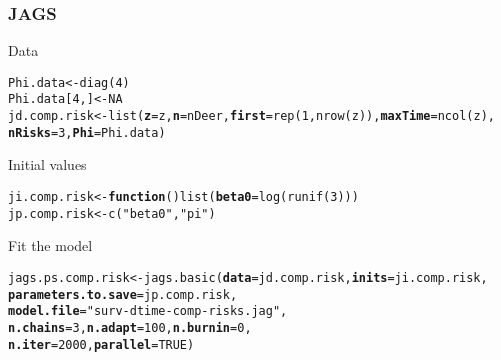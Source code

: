 \documentclass[color=usenames,dvipsnames]{beamer}\usepackage[]{graphicx}\usepackage[]{color}
\makeatletter
\newcommand{\hlnum}[1]{\textcolor[rgb]{0.69,0.494,0}{#1}}%
\newcommand{\hlstr}[1]{\textcolor[rgb]{0.749,0.012,0.012}{#1}}%
\newcommand{\hlstd}[1]{\textcolor[rgb]{0,0,0}{#1}}%
\newcommand{\hlkwa}[1]{\textcolor[rgb]{0,0,0}{\textbf{#1}}}%
\newcommand{\hlkwb}[1]{\textcolor[rgb]{0,0.341,0.682}{#1}}%
\newcommand{\hlkwc}[1]{\textcolor[rgb]{0,0,0}{\textbf{#1}}}%
\newcommand{\hlkwd}[1]{\textcolor[rgb]{0.004,0.004,0.506}{#1}}%
\newenvironment{kframe}{%
 \def\at@end@of@kframe{}%
 \ifinner\ifhmode%
  \def\at@end@of@kframe{\end{minipage}}%
  \begin{minipage}{\columnwidth}%
 \fi\fi%
 \def\FrameCommand##1{\hskip\@totalleftmargin \hskip-\fboxsep
 \colorbox{shadecolor}{##1}\hskip-\fboxsep
     \hskip-\linewidth \hskip-\@totalleftmargin \hskip\columnwidth}%
 \MakeFramed {\advance\hsize-\width
   \@totalleftmargin\z@ \linewidth\hsize
   \@setminipage}}%
 {\par\unskip\endMakeFramed%
 \at@end@of@kframe}
\newenvironment{knitrout}{}{} %
\makeatother
\begin{document}
\begin{frame}[fragile]
  \frametitle{JAGS}
  Data
\begin{knitrout}\scriptsize
{}\color{fgcolor}\begin{kframe}
\begin{alltt}
\hlstd{Phi.data} \hlkwb{<-} \hlkwd{diag}\hlstd{(}\hlnum{4}\hlstd{)}
\hlstd{Phi.data[}\hlnum{4}\hlstd{,]} \hlkwb{<-} \hlnum{NA}
\hlstd{jd.comp.risk} \hlkwb{<-} \hlkwd{list}\hlstd{(}\hlkwc{z}\hlstd{=z,} \hlkwc{n}\hlstd{=nDeer,} \hlkwc{first}\hlstd{=}\hlkwd{rep}\hlstd{(}\hlnum{1}\hlstd{,}\hlkwd{nrow}\hlstd{(z)),} \hlkwc{maxTime}\hlstd{=}\hlkwd{ncol}\hlstd{(z),}
                     \hlkwc{nRisks}\hlstd{=}\hlnum{3}\hlstd{,} \hlkwc{Phi}\hlstd{=Phi.data)}
\end{alltt}
\end{kframe}
\end{knitrout}
  Initial values
  \scriptsize
\begin{knitrout}\scriptsize
{}\color{fgcolor}\begin{kframe}
\begin{alltt}
\hlstd{ji.comp.risk} \hlkwb{<-} \hlkwa{function}\hlstd{()} \hlkwd{list}\hlstd{(}\hlkwc{beta0}\hlstd{=}\hlkwd{log}\hlstd{(}\hlkwd{runif}\hlstd{(}\hlnum{3}\hlstd{)))}
\hlstd{jp.comp.risk} \hlkwb{<-} \hlkwd{c}\hlstd{(}\hlstr{"beta0"}\hlstd{,} \hlstr{"pi"}\hlstd{)}
\end{alltt}
\end{kframe}
\end{knitrout}
\pause
\vfill
  {\normalsize Fit the model}
\begin{knitrout}\scriptsize
{}\color{fgcolor}\begin{kframe}
\begin{alltt}
\hlstd{jags.ps.comp.risk} \hlkwb{<-} \hlkwd{jags.basic}\hlstd{(}\hlkwc{data}\hlstd{=jd.comp.risk,} \hlkwc{inits}\hlstd{=ji.comp.risk,}
                                \hlkwc{parameters.to.save}\hlstd{=jp.comp.risk,}
                                \hlkwc{model.file}\hlstd{=}\hlstr{"surv-dtime-comp-risks.jag"}\hlstd{,}
                                \hlkwc{n.chains}\hlstd{=}\hlnum{3}\hlstd{,} \hlkwc{n.adapt}\hlstd{=}\hlnum{100}\hlstd{,} \hlkwc{n.burnin}\hlstd{=}\hlnum{0}\hlstd{,}
                                \hlkwc{n.iter}\hlstd{=}\hlnum{2000}\hlstd{,} \hlkwc{parallel}\hlstd{=}\hlnum{TRUE}\hlstd{)}
\end{alltt}
\end{kframe}
\end{knitrout}
\end{frame}
\end{document}
